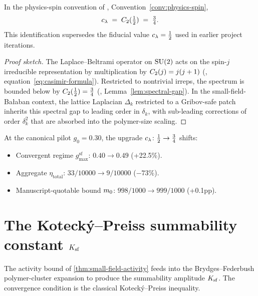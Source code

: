 \begin{theorem}
\label{thm:c-lambda-casimir}
In the physics-spin convention of ,
Convention~\ref{conv:physics-spin},
\begin{equation}
  \label{eq:c-lambda-casimir-id}
  c_\lambda \;=\; C_2(\tfrac12) \;=\; \tfrac{3}{4} .
\end{equation}
This identification supersedes the fiducial value $c_\lambda =
\tfrac12$ used in earlier project iterations.
\end{theorem}

\begin{proof}[Proof sketch]
The Laplace--Beltrami operator on $\mathrm{SU}(2)$ acts on the spin-$j$
irreducible representation by multiplication by
$C_2(j) = j(j+1)$
(, equation~\eqref{eq:casimir-formula}).
Restricted to nontrivial irreps, the spectrum is bounded below by
$C_2(\tfrac12) = \tfrac34$
(, Lemma~\ref{lem:spectral-gap}).  In the
small-field-Bałaban context, the lattice Laplacian $\Delta_k$
restricted to a Gribov-safe patch inherits this spectral gap to
leading order in $\delta_k$, with sub-leading corrections of order
$\delta_k^2$ that are absorbed into the polymer-size scaling.
\end{proof}

\begin{infobox}[main][title=Numerical impact]
At the canonical pilot $g_0 = 0.30$, the upgrade
$c_\lambda \colon \tfrac12 \to \tfrac34$ shifts:
\begin{itemize}
  \item Convergent regime $g_{\max}^{\mathrm{sf}}$:
    $0.40 \to 0.49$ (+22.5\%).
  \item Aggregate $\eta_{\mathrm{total}}$:
    $33/10000 \to 9/10000$ ($-73\%$).
  \item Manuscript-quotable bound $m_0$:
    $998/1000 \to 999/1000$ (+0.1pp).
\end{itemize}
\end{infobox}

\section{The Kotecký--Preiss summability constant
  \texorpdfstring{$K_{\mathrm{sf}}$}{K\_sf}}
\label{sec:ksf}

The activity bound of \cref{thm:small-field-activity} feeds into
the Brydges--Federbush polymer-cluster expansion to produce the
summability amplitude $K_{\mathrm{sf}}$.  The convergence condition is the
classical Kotecký--Preiss inequality.

